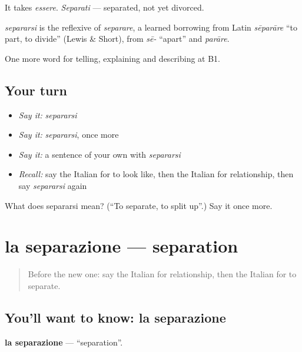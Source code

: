 It takes \emph{essere}. \emph{Separati} — separated, not yet divorced.

\begin{cousinweb}
\emph{separarsi} is the reflexive of \emph{separare}, a learned borrowing from Latin \emph{sēparāre} \textquotedblleft{}to part, to divide\textquotedblright{} (Lewis \& Short), from \emph{sē-} \textquotedblleft{}apart\textquotedblright{} and \emph{parāre}.
\end{cousinweb}

\begin{grammarlens}[title={What you've built}]
One more word for telling, explaining and describing at B1.
\end{grammarlens}

\subsection*{Your turn}
\begin{itemize}
\raggedright
  \item \emph{Say it:} \emph{separarsi}
  \item \emph{Say it:} \emph{separarsi}, once more
  \item \emph{Say it:} a sentence of your own with \emph{separarsi}
  \item \emph{Recall:} say the Italian for to look like, then the Italian for relationship, then say \emph{separarsi} again
\end{itemize}

\begin{tcolorbox}[breakable,colback=teal!4,colframe=teal!35!black,title={Before you move on}]
What does separarsi mean? (\textquotedblleft{}To separate, to split up\textquotedblright{}.) Say it once more.
\end{tcolorbox}
\section[la separazione]{la separazione — separation}

\label{lesson:IT-C494-separazione}



\begin{quote}
Before the new one: say the Italian for relationship, then the Italian for to separate.
\end{quote}

\subsection*{You'll want to know: la separazione}
\textbf{la separazione} — \textquotedblleft{}separation\textquotedblright{}.

